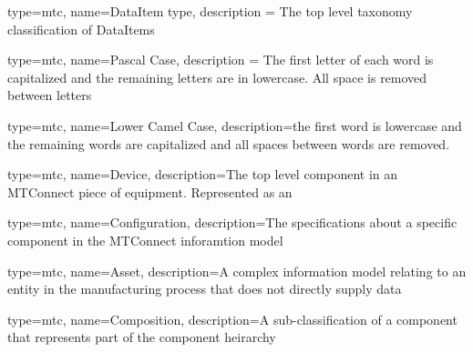 {
  type=mtc,
  name={DataItem type},
  description = {The top level taxonomy classification of \glspl{DataItem}}
}

{
  type=mtc,
  name={Pascal Case},
  description = {The first letter of each word is capitalized and the remaining letters are in lowercase. All space is removed between letters}
}

{
  type=mtc,
  name={Lower Camel Case},
  description={the first word is lowercase and the remaining words are capitalized and all spaces between words are removed.}
}


{
  type=mtc,
  name=Device,
  description={The top level component in an MTConnect piece of equipment. Represented as an }
}

{
  type=mtc,
  name=Configuration,
  description={The specifications about a specific component in the MTConnect inforamtion model}
}

{
  type=mtc,
  name=Asset,
  description={A complex information model relating to an entity in the manufacturing process that does not directly supply data}
}

{
  type=mtc,
  name=Composition,
  description={A sub-classification of a component that represents part of the component heirarchy}
}


